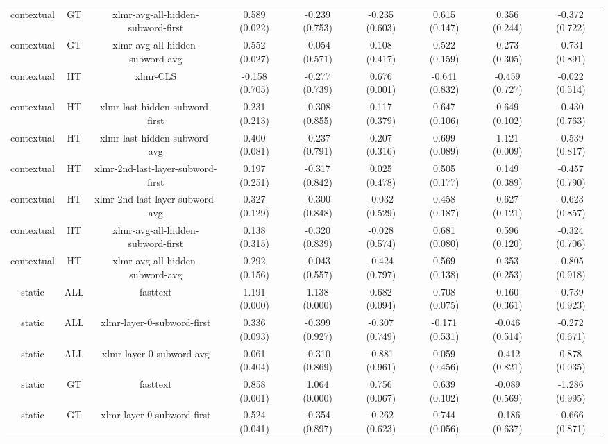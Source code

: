 \begin{sidewaystable}[htb]
\begin{tabular}{@{}ccccccccc@{}}
        contextual & GT & xlmr-avg-all-hidden-subword-first & 0.589 (0.022) & -0.239 (0.753) & -0.235 (0.603) & 0.615 (0.147) & 0.356 (0.244) & -0.372 (0.722) \\
        contextual & GT & xlmr-avg-all-hidden-subword-avg & 0.552 (0.027) & -0.054 (0.571) & 0.108 (0.417) & 0.522 (0.159) & 0.273 (0.305) & -0.731 (0.891) \\
        contextual & HT & xlmr-CLS & -0.158 (0.705) & -0.277 (0.739) & 0.676 (0.001) & -0.641 (0.832) & -0.459 (0.727) & -0.022 (0.514) \\
        contextual & HT & xlmr-last-hidden-subword-first & 0.231 (0.213) & -0.308 (0.855) & 0.117 (0.379) & 0.647 (0.106) & 0.649 (0.102) & -0.430 (0.763) \\
        contextual & HT & xlmr-last-hidden-subword-avg & 0.400 (0.081) & -0.237 (0.791) & 0.207 (0.316) & 0.699 (0.089) & 1.121 (0.009) & -0.539 (0.817) \\
        contextual & HT & xlmr-2nd-last-layer-subword-first & 0.197 (0.251) & -0.317 (0.842) & 0.025 (0.478) & 0.505 (0.177) & 0.149 (0.389) & -0.457 (0.790) \\
        contextual & HT & xlmr-2nd-last-layer-subword-avg & 0.327 (0.129) & -0.300 (0.848) & -0.032 (0.529) & 0.458 (0.187) & 0.627 (0.121) & -0.623 (0.857) \\
        contextual & HT & xlmr-avg-all-hidden-subword-first & 0.138 (0.315) & -0.320 (0.839) & -0.028 (0.574) & 0.681 (0.080) & 0.596 (0.120) & -0.324 (0.706) \\
        contextual & HT & xlmr-avg-all-hidden-subword-avg & 0.292 (0.156) & -0.043 (0.557) & -0.424 (0.797) & 0.569 (0.138) & 0.353 (0.253) & -0.805 (0.918) \\
        static & ALL & fasttext & 1.191 (0.000) & 1.138 (0.000) & 0.682 (0.094) & 0.708 (0.075) & 0.160 (0.361) & -0.739 (0.923) \\
        static & ALL & xlmr-layer-0-subword-first & 0.336 (0.093) & -0.399 (0.927) & -0.307 (0.749) & -0.171 (0.531) & -0.046 (0.514) & -0.272 (0.671) \\
        static & ALL & xlmr-layer-0-subword-avg & 0.061 (0.404) & -0.310 (0.869) & -0.881 (0.961) & 0.059 (0.456) & -0.412 (0.821) & 0.878 (0.035) \\
        static & GT & fasttext & 0.858 (0.001) & 1.064 (0.000) & 0.756 (0.067) & 0.639 (0.102) & -0.089 (0.569) & -1.286 (0.995) \\
        static & GT & xlmr-layer-0-subword-first & 0.524 (0.041) & -0.354 (0.897) & -0.262 (0.623) & 0.744 (0.056) & -0.186 (0.637) & -0.666 (0.871) \\

\end{tabular}
\end{sidewaystable}
